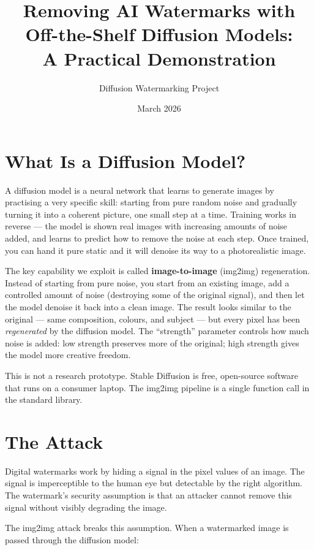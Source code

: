 \documentclass[11pt,a4paper]{article}
\title{Removing AI Watermarks with Off-the-Shelf Diffusion Models:\\
       A Practical Demonstration}
\author{Diffusion Watermarking Project}
\date{March 2026}
\begin{document}
\maketitle

\section{What Is a Diffusion Model?}

A diffusion model is a neural network that learns to generate images by
practising a very specific skill: starting from pure random noise and
gradually turning it into a coherent picture, one small step at a time.
Training works in reverse --- the model is shown real images with
increasing amounts of noise added, and learns to predict how to remove
the noise at each step. Once trained, you can hand it pure static and it
will denoise its way to a photorealistic image.

The key capability we exploit is called \textbf{image-to-image} (img2img)
regeneration. Instead of starting from pure noise, you start from an
existing image, add a controlled amount of noise (destroying some of the
original signal), and then let the model denoise it back into a clean
image. The result looks similar to the original --- same composition,
colours, and subject --- but every pixel has been \emph{regenerated} by
the diffusion model. The ``strength'' parameter controls how much noise
is added: low strength preserves more of the original; high strength
gives the model more creative freedom.

This is not a research prototype. Stable Diffusion is free, open-source
software that runs on a consumer laptop. The img2img pipeline is a
single function call in the standard library.

\section{The Attack}

Digital watermarks work by hiding a signal in the pixel values of an
image. The signal is imperceptible to the human eye but detectable by
the right algorithm. The watermark's security assumption is that an
attacker cannot remove this signal without visibly degrading the image.

The img2img attack breaks this assumption. When a watermarked image is
passed through the diffusion model:
\end{document}
